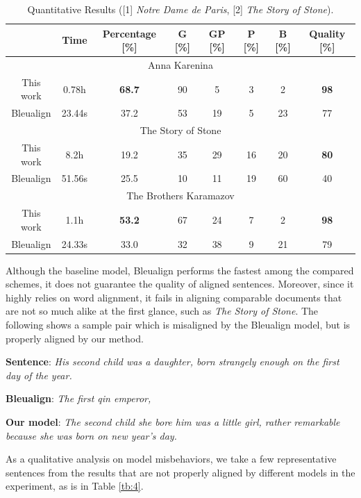 \begin{table}[htbp]\footnotesize
	\centering
	\small
	\begin{tabular}{|c|c|c|c|c|c|c|c|}
		\hline
		\textbf{\diagbox{Model}{Result}} & Time & Percentage [\%] & G [\%] & GP [\%] & P [\%] & B [\%] & Quality [\%] \\
		\hline
		\multicolumn{8}{|c|}{Anna Karenina} \\
		\hline
		This work & 0.78h & \textbf{68.7} & 90 & 5 & 3 & 2 & \textbf{98} \\
		Bleualign & 23.44s & 37.2 & 53 & 19 & 5 & 23 & 77 \\
		\hline
		\multicolumn{8}{|c|}{The Story of Stone} \\
		\hline
		This work & 8.2h & 19.2 & 35 & 29 & 16 & 20 & \textbf{80} \\
		Bleualign & 51.56s & 25.5 & 10 & 11 & 19 & 60 & 40 \\
		\hline
		\multicolumn{8}{|c|}{The Brothers Karamazov} \\
		\hline
		This work & 1.1h & \textbf{53.2} & 67 & 24 & 7 & 2 & \textbf{98} \\
		Bleualign & 24.33s & 33.0 & 32 & 38 & 9 & 21 & 79 \\
		\hline
	\end{tabular}
	\caption{Quantitative Results ([1] \emph{Notre Dame de Paris}, [2] \emph{The Story of Stone}).}\label{tb:8}
\end{table}

Although the baseline model, Bleualign performs the fastest among the compared schemes, it does not guarantee the quality of aligned sentences. Moreover, since it highly relies on word alignment, it fails in aligning comparable documents that are not so much alike at the first glance, such as \emph{The Story of Stone}. The following shows a sample pair which is misaligned by the Bleualign model, but is properly aligned by our method.

\textbf{Sentence}: \emph{His second child was a daughter, born strangely enough on the first day of the year.}

\textbf{Bleualign}: \emph{The first qin emperor,}

\textbf{Our model}: \emph{The second child she bore him was a little girl, rather remarkable because she was born on new year’s day.}

As a qualitative analysis on model misbehaviors, we take a few representative sentences from the results that are not properly aligned by different models in the experiment, as is in Table \ref{tb:4}. 

